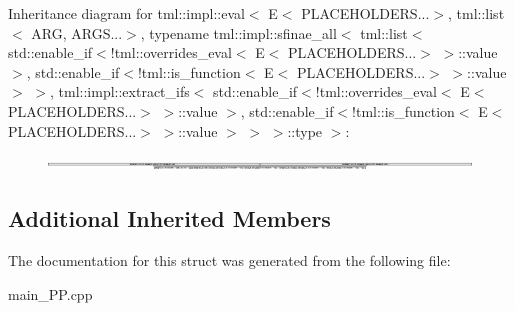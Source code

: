 Inheritance diagram for tml\+:\+:impl\+:\+:eval$<$ E$<$ P\+L\+A\+C\+E\+H\+O\+L\+D\+E\+R\+S...$>$, tml\+:\+:list$<$ A\+R\+G, A\+R\+G\+S...$>$, typename tml\+:\+:impl\+:\+:sfinae\+\_\+all$<$ tml\+:\+:list$<$ std\+:\+:enable\+\_\+if$<$!tml\+:\+:overrides\+\_\+eval$<$ E$<$ P\+L\+A\+C\+E\+H\+O\+L\+D\+E\+R\+S...$>$ $>$\+:\+:value $>$, std\+:\+:enable\+\_\+if$<$!tml\+:\+:is\+\_\+function$<$ E$<$ P\+L\+A\+C\+E\+H\+O\+L\+D\+E\+R\+S...$>$ $>$\+:\+:value $>$ $>$, tml\+:\+:impl\+:\+:extract\+\_\+ifs$<$ std\+:\+:enable\+\_\+if$<$!tml\+:\+:overrides\+\_\+eval$<$ E$<$ P\+L\+A\+C\+E\+H\+O\+L\+D\+E\+R\+S...$>$ $>$\+:\+:value $>$, std\+:\+:enable\+\_\+if$<$!tml\+:\+:is\+\_\+function$<$ E$<$ P\+L\+A\+C\+E\+H\+O\+L\+D\+E\+R\+S...$>$ $>$\+:\+:value $>$ $>$ $>$\+:\+:type $>$\+:\begin{figure}[H]
\begin{center}
\leavevmode
\includegraphics[height=0.232945cm]{structtml_1_1impl_1_1eval_3_01E_3_01PLACEHOLDERS_8_8_8_4_00_01tml_1_1list_3_01ARG_00_01ARGS_8_8_d9224fd8e39413272824ce432316a84a}
\end{center}
\end{figure}
\subsection*{Additional Inherited Members}


The documentation for this struct was generated from the following file\+:\begin{DoxyCompactItemize}
\item 
main\+\_\+\+P\+P.\+cpp\end{DoxyCompactItemize}
